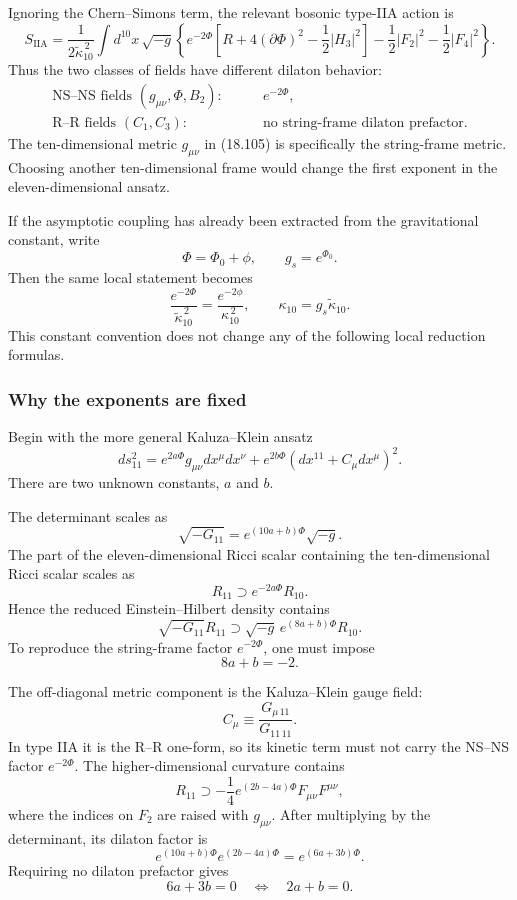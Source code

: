 \documentclass[
  10pt,
  a4paper,
  openany]{book}
\begin{document}
Ignoring the Chern--Simons term, the relevant bosonic type-IIA action is
\[
S_{\mathrm{IIA}}
=\frac1{2\widetilde\kappa_{10}^{\,2}}
\int d^{10}x\,\sqrt{-g}
\left\{
e^{-2\Phi}
\left[
R+4(\partial\Phi)^2-\frac12|H_3|^2
\right]
-\frac12|F_2|^2
-\frac12|F_4|^2
\right\}.
\] Thus the two classes of fields have different dilaton behavior: \[
\begin{aligned}
\text{NS--NS fields }(g_{\mu\nu},\Phi,B_2):
&\qquad e^{-2\Phi},\\
\text{R--R fields }(C_1,C_3):
&\qquad \text{no string-frame dilaton prefactor}.
\end{aligned}
\] The ten-dimensional metric \(g_{\mu\nu}\) in (18.105) is specifically
the string-frame metric. Choosing another ten-dimensional frame would
change the first exponent in the eleven-dimensional ansatz.

If the asymptotic coupling has already been extracted from the
gravitational constant, write \[
\Phi=\Phi_0+\phi,
\qquad
g_s=e^{\Phi_0}.
\] Then the same local statement becomes \[
\frac{e^{-2\Phi}}{\widetilde\kappa_{10}^{\,2}}
=\frac{e^{-2\phi}}{\kappa_{10}^{\,2}},
\qquad
\kappa_{10}=g_s\widetilde\kappa_{10}.
\] This constant convention does not change any of the following local
reduction formulas.

\subsubsection{Why the exponents are
fixed}\label{why-the-exponents-are-fixed}

Begin with the more general Kaluza--Klein ansatz \[
ds_{11}^2
=e^{2a\Phi}g_{\mu\nu}dx^\mu dx^\nu
+e^{2b\Phi}
\left(dx^{11}+C_\mu dx^\mu\right)^2.
\] There are two unknown constants, \(a\) and \(b\).

The determinant scales as \[
\sqrt{-G_{11}}
=e^{(10a+b)\Phi}\sqrt{-g}.
\] The part of the eleven-dimensional Ricci scalar containing the
ten-dimensional Ricci scalar scales as \[
R_{11}
\supset
e^{-2a\Phi}R_{10}.
\] Hence the reduced Einstein--Hilbert density contains \[
\sqrt{-G_{11}}R_{11}
\supset
\sqrt{-g}\,
e^{(8a+b)\Phi}R_{10}.
\] To reproduce the string-frame factor \(e^{-2\Phi}\), one must impose
\[
\boxed{8a+b=-2}.
\]

The off-diagonal metric component is the Kaluza--Klein gauge field: \[
C_\mu
\equiv
\frac{G_{\mu\,11}}{G_{11\,11}}.
\] In type IIA it is the R--R one-form, so its kinetic term must not
carry the NS--NS factor \(e^{-2\Phi}\). The higher-dimensional curvature
contains \[
R_{11}
\supset
-\frac14e^{(2b-4a)\Phi}F_{\mu\nu}F^{\mu\nu},
\] where the indices on \(F_2\) are raised with \(g_{\mu\nu}\). After
multiplying by the determinant, its dilaton factor is \[
e^{(10a+b)\Phi}e^{(2b-4a)\Phi}
=e^{(6a+3b)\Phi}.
\] Requiring no dilaton prefactor gives \[
6a+3b=0
\quad\Longleftrightarrow\quad
\boxed{2a+b=0}.
\]
\end{document}
